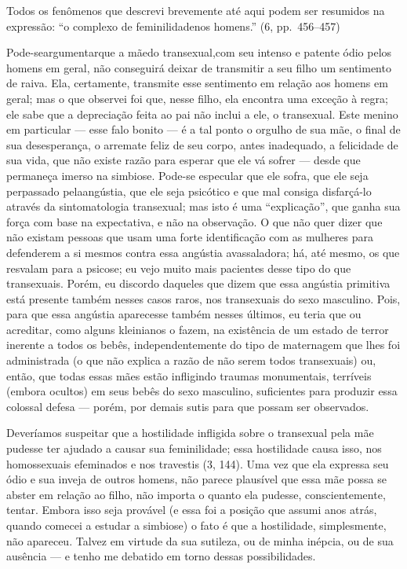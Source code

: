 Todos os fenômenos que descrevi brevemente até aqui podem ser
resumidos na expressão: ``o complexo de feminilidade\idxcompl[|)] nos
homens.'' (6, pp.~456--457)


Pode-se\idxtransesimb[|(] argumentar\idxmaestran[|(] que a mãe\idxmaesfilh[|(] do transexual,\idxhostmaes[|(] com seu intenso e
patente ódio pelos homens em geral, não conseguirá deixar de transmitir
a seu filho um sentimento de raiva. Ela, certamente, transmite esse
sentimento em relação aos homens em geral; mas o que observei foi que,
nesse filho, ela encontra uma exceção à regra; ele sabe que a
depreciação feita ao pai não inclui a ele, o transexual. Este menino em
particular --- esse falo bonito\idxmaesfalo{} --- é a tal ponto o orgulho de sua
mãe, o final de sua desesperança, o arremate feliz de seu corpo, antes
inadequado, a felicidade de sua vida, que não existe razão para esperar
que ele vá sofrer --- desde que permaneça imerso na simbiose. Pode-se
especular que ele sofra, que ele seja perpassado pela\idxangushos[|(] angústia,\idxanguinfa{} que ele
seja psicótico e que mal consiga disfarçá-lo através da sintomatologia
transexual; mas isto é uma ``explicação'',
que ganha sua força com base na expectativa, e não na observação. O que
não quer dizer que não existam pessoas que usam uma forte identificação
com as mulheres para defenderem a si mesmos contra essa angústia
avassaladora; há, até mesmo, os que resvalam para a psicose; eu vejo
muito mais pacientes desse tipo do que transexuais. Porém, eu discordo
daqueles que dizem que essa angústia primitiva está presente também
nesses casos raros, nos transexuais do sexo masculino. Pois, para que
essa angústia aparecesse também nesses últimos, eu teria que ou
acreditar, como alguns kleinianos\idxklein{} o fazem, na existência de um estado
de terror inerente a todos os bebês, independentemente do tipo de
maternagem\idxhomosexpe{} que lhes foi administrada (o que não explica a razão de não
serem todos transexuais) ou, então, que todas essas mães estão
infligindo traumas monumentais, terríveis (embora ocultos) em seus
bebês do sexo masculino, suficientes para produzir essa colossal
defesa --- porém, por demais sutis para que possam ser observados.

Deveríamos suspeitar que a\idxmaeshost{} hostilidade\idxinfanangu{} infligida sobre o transexual
pela mãe\idxmaeshomo{} pudesse ter ajudado a causar sua feminilidade; essa
hostilidade causa isso, nos homossexuais efeminados e nos travestis (3,
144). Uma vez que ela expressa seu ódio e sua inveja de outros homens,
não parece plausível que essa mãe possa se abster em relação ao filho,
não importa o quanto ela pudesse, conscientemente, tentar. Embora isso
seja provável (e essa foi a posição que assumi anos atrás, quando
comecei a estudar a simbiose) o fato é que a hostilidade, simplesmente,
não apareceu. Talvez em virtude da sua sutileza, ou de minha inépcia,
ou de sua ausência --- e tenho me debatido em torno dessas
possibilidades.

